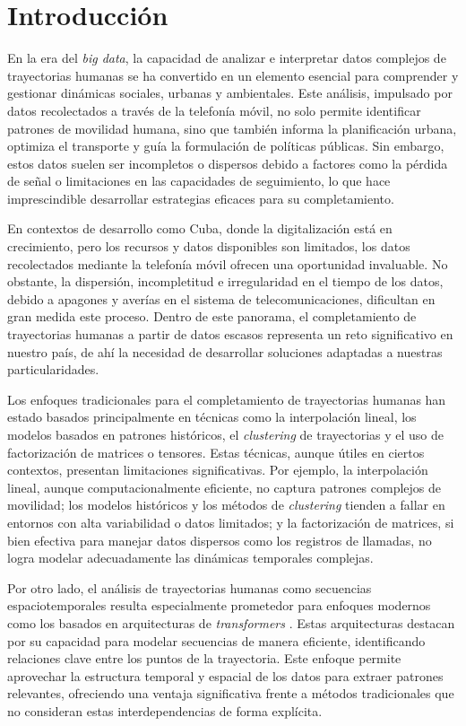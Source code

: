 \chapter*{Introducción}\label{chapter:introduction}

En la era del \textit{big data}, la capacidad de analizar e interpretar datos complejos de trayectorias humanas se ha convertido en un elemento esencial para comprender y gestionar dinámicas sociales, urbanas y ambientales. Este análisis, impulsado por datos recolectados a través de la telefonía móvil, no solo permite identificar patrones de movilidad humana, sino que también informa la planificación urbana, optimiza el transporte y guía la formulación de políticas públicas. Sin embargo, estos datos suelen ser incompletos o dispersos debido a factores como la pérdida de señal o limitaciones en las capacidades de seguimiento, lo que hace imprescindible desarrollar estrategias eficaces para su completamiento.

En contextos de desarrollo como Cuba, donde la digitalización está en crecimiento, pero los recursos y datos disponibles son limitados, los datos recolectados mediante la telefonía móvil ofrecen una oportunidad invaluable. No obstante, la dispersión, incompletitud e irregularidad en el tiempo de los datos, debido a apagones y averías en el sistema de telecomunicaciones, dificultan en gran medida este proceso. Dentro de este panorama, el completamiento de trayectorias humanas a partir de datos escasos representa un reto significativo en nuestro país, de ahí la necesidad de desarrollar soluciones adaptadas a nuestras particularidades.

Los enfoques tradicionales para el completamiento de trayectorias humanas han estado basados principalmente en técnicas como la interpolación lineal, los modelos basados en patrones históricos, el \textit{clustering} de trayectorias y el uso de factorización de matrices o tensores. Estas técnicas, aunque útiles en ciertos contextos, presentan limitaciones significativas. Por ejemplo, la interpolación lineal, aunque computacionalmente eficiente, no captura patrones complejos de movilidad; los modelos históricos y los métodos de \textit{clustering} tienden a fallar en entornos con alta variabilidad o datos limitados; y la factorización de matrices, si bien efectiva para manejar datos dispersos como los registros de llamadas, no logra modelar adecuadamente las dinámicas temporales complejas.

Por otro lado, el análisis de trayectorias humanas como secuencias espaciotemporales resulta especialmente prometedor para enfoques modernos como los basados en arquitecturas de \textit{transformers} \cite{vaswani2017attention}. Estas arquitecturas destacan por su capacidad para modelar secuencias de manera eficiente, identificando relaciones clave entre los puntos de la trayectoria. Este enfoque permite aprovechar la estructura temporal y espacial de los datos para extraer patrones relevantes, ofreciendo una ventaja significativa frente a métodos tradicionales que no consideran estas interdependencias de forma explícita.

